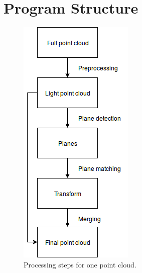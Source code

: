\section{Program Structure}

\begin{figure}[h!]
    \centering
    \includegraphics[scale=0.5]{images/pipeline_simple.png}
    \caption{Processing steps for one point cloud.}
    \label{fig:cut}
\end{figure}
